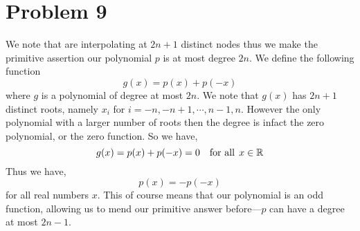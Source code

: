 \documentclass[11pt]{article}
\begin{document}
\newpage
\section*{Problem 9}
We note that are interpolating at $2n+1$ distinct nodes thus we make the primitive assertion our polynomial $p$ is at most degree $2n$. We define the following function 
\[g(x) = p(x) + p(-x)\]
where $g$ is a polynomial of degree at most $2n$. We note that $g(x)$ has $2n+1$ distinct roots, namely $x_i$ for $i=-n,-n+1, \cdots, n-1, n$. However the only polynomial with a larger number of roots then the degree is infact the zero polynomial, or the zero function. So we have, 
\[g(x) = p(x) + p(-x) =0 \quad \hbox{for all}\: \: x \in \mathbb{R}\]
Thus we have, 
\[p(x) = -p(-x)\]
for all real numbers $x$. This of course means that our polynomial is an odd function, allowing us to mend our primitive answer before---$p$ can have a degree at most $2n-1$.
\end{document}
